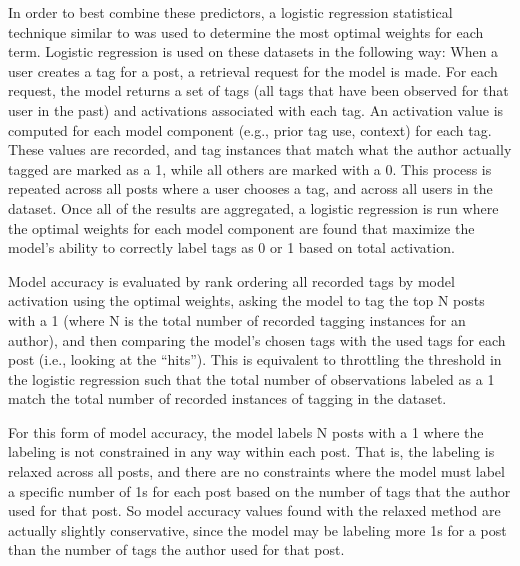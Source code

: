 \documentclass[man,floatsintext,donotrepeattitle]{apa6}
\begin{document}
In order to best combine these predictors, a logistic regression statistical technique similar to \textcite{Stanley2013} was used to determine the most optimal weights for each term.
Logistic regression is used on these datasets in the following way:
When a user creates a tag for a post, a retrieval request for the model is made.
For each request, the model returns a set of tags (all tags that have been observed for that user in the past) and activations associated with each tag.
An activation value is computed for each model component (e.g., prior tag use, context) for each tag.
These values are recorded, and tag instances that match what the author actually tagged are marked as a 1, while all others are marked with a 0.
This process is repeated across all posts where a user chooses a tag, and across all users in the dataset.
Once all of the results are aggregated, a logistic regression is run where the optimal weights for each model component are found that maximize the model's ability to correctly label tags as 0 or 1 based on total activation.

Model accuracy is evaluated by rank ordering all recorded tags by model activation using the optimal weights,
asking the model to tag the top N posts with a 1 (where N is the total number of recorded tagging instances for an author),
and then comparing the model's chosen tags with the used tags for each post (i.e., looking at the ``hits'').
This is equivalent to throttling the threshold in the logistic regression such that the total number of observations labeled as a 1 match the total number of recorded instances of tagging in the dataset.

For this form of model accuracy, the model labels N posts with a 1 where the labeling is not constrained in any way within each post.
That is, the labeling is relaxed across all posts, and there are no constraints where the model must label a specific number of 1s for each post based on the number of tags that the author used for that post.
So model accuracy values found with the relaxed method are actually slightly conservative, since the model may be labeling more 1s for a post than the number of tags the author used for that post.
\end{document}
